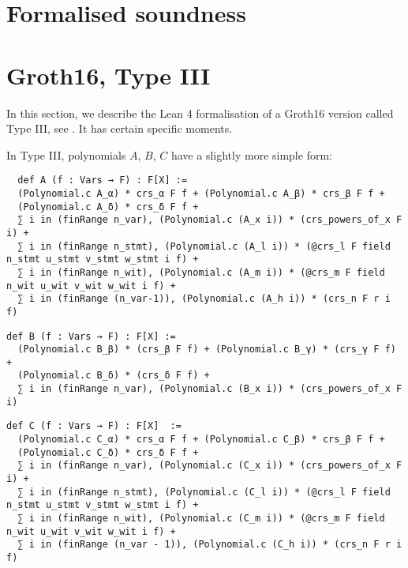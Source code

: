 \documentclass{article}
\theoremstyle{definition}
\theoremstyle{remark}
\begin{document}
\section{Formalised soundness}



\section{Groth16, Type III}

In this section, we describe the Lean 4 formalisation of a Groth16 version called Type III, see \cite{baghery2021another}. It has certain specific moments.

In Type III, polynomials $A$, $B$, $C$ have a slightly more simple form:
\begin{lstlisting}
  def A (f : Vars → F) : F[X] :=
  (Polynomial.c A_α) * crs_α F f + (Polynomial.c A_β) * crs_β F f +
  (Polynomial.c A_δ) * crs_δ F f +
  ∑ i in (finRange n_var), (Polynomial.c (A_x i)) * (crs_powers_of_x F i) +
  ∑ i in (finRange n_stmt), (Polynomial.c (A_l i)) * (@crs_l F field n_stmt u_stmt v_stmt w_stmt i f) +
  ∑ i in (finRange n_wit), (Polynomial.c (A_m i)) * (@crs_m F field n_wit u_wit v_wit w_wit i f) +
  ∑ i in (finRange (n_var-1)), (Polynomial.c (A_h i)) * (crs_n F r i f)
\end{lstlisting}

\begin{lstlisting}
def B (f : Vars → F) : F[X] :=
  (Polynomial.c B_β) * (crs_β F f) + (Polynomial.c B_γ) * (crs_γ F f) +
  (Polynomial.c B_δ) * (crs_δ F f) +
  ∑ i in (finRange n_var), (Polynomial.c (B_x i)) * (crs_powers_of_x F i)
\end{lstlisting}

\begin{lstlisting}
def C (f : Vars → F) : F[X]  :=
  (Polynomial.c C_α) * crs_α F f + (Polynomial.c C_β) * crs_β F f +
  (Polynomial.c C_δ) * crs_δ F f +
  ∑ i in (finRange n_var), (Polynomial.c (C_x i)) * (crs_powers_of_x F i) +
  ∑ i in (finRange n_stmt), (Polynomial.c (C_l i)) * (@crs_l F field n_stmt u_stmt v_stmt w_stmt i f) +
  ∑ i in (finRange n_wit), (Polynomial.c (C_m i)) * (@crs_m F field n_wit u_wit v_wit w_wit i f) +
  ∑ i in (finRange (n_var - 1)), (Polynomial.c (C_h i)) * (crs_n F r i f)
\end{lstlisting}



\end{document}
